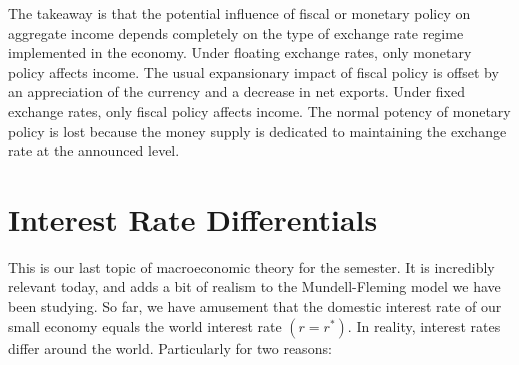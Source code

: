 \documentclass[10pt]{article}
\begin{document}
The takeaway is that the potential influence of fiscal or monetary policy on aggregate income depends completely on the type of exchange rate regime implemented in the economy. Under floating exchange rates, only monetary policy affects income. The usual expansionary impact of fiscal policy is offset by an appreciation of the currency and a decrease in net exports. Under fixed exchange rates, only fiscal policy affects income. The normal potency of monetary policy is lost because the money supply is dedicated to maintaining the exchange rate at the announced level.

\section*{Interest Rate Differentials}
This is our last topic of macroeconomic theory for the semester. It is incredibly relevant today, and adds a bit of realism to the Mundell-Fleming model we have been studying. So far, we have amusement that the domestic interest rate of our small economy equals the world interest rate $\left(r=r^{*}\right)$. In reality, interest rates differ around the world. Particularly for two reasons:
\end{document}

